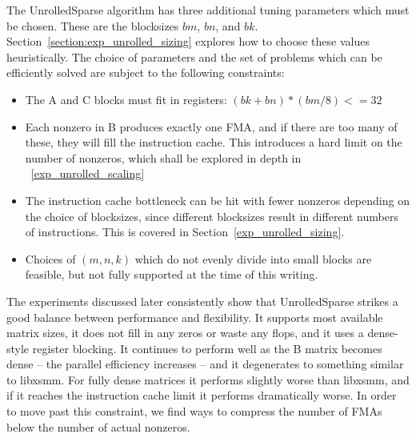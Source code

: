 The UnrolledSparse algorithm has three additional tuning parameters which must be chosen. These are the blocksizes $bm$, $bn$, and $bk$. Section~\ref{section:exp_unrolled_sizing} explores how to choose these values heuristically. The choice of parameters and the set of problems which can be efficiently solved are subject to the following constraints:

\begin{itemize}
  \item The A and C blocks must fit in registers: $(bk + bn) * (bm / 8) <= 32$
  
  \item Each nonzero in B produces exactly one FMA, and if there are too many of these, they will fill the instruction cache. This introduces a hard limit on the number of nonzeros, which shall be explored in depth in ~\ref{exp_unrolled_scaling}
  
  \item The instruction cache bottleneck can be hit with fewer nonzeros depending on the choice of blocksizes, since different blocksizes result in different numbers of  instructions. This is covered in Section~\ref{exp_unrolled_sizing}.

  \item Choices of $(m,n,k)$ which do not evenly divide into small blocks are feasible, but not fully supported at the time of this writing.
\end{itemize}

The experiments discussed later consistently show that UnrolledSparse strikes a good balance between performance and flexibility. It supports most available matrix sizes, it does not fill in any zeros or waste any flops, and it uses a dense-style register blocking. It continues to perform well as the B matrix becomes dense -- the parallel efficiency increases -- and it degenerates to something similar to libxsmm. For fully dense matrices it performs slightly worse than libxsmm, and if it reaches the instruction cache limit it performs dramatically worse. In order to move past this constraint, we find ways to compress the number of FMAs below the number of actual nonzeros.

